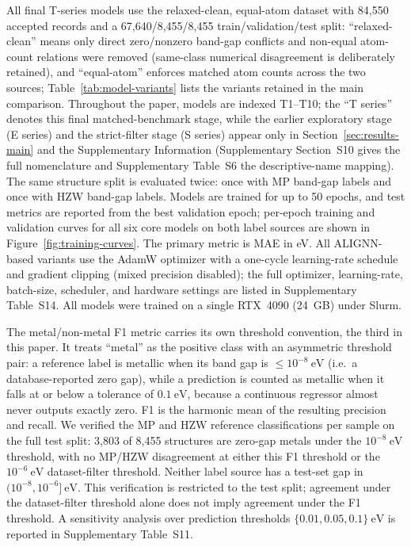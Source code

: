 \documentclass[a4paper,11pt]{article}
\newcommand{\ev}{\mathrm{eV}}
\begin{document}
All final T-series models use the relaxed-clean, equal-atom dataset with 84,550 accepted records and a 67,640/8,455/8,455 train/validation/test split: ``relaxed-clean'' means only direct zero/nonzero band-gap conflicts and non-equal atom-count relations were removed (same-class numerical disagreement is deliberately retained), and ``equal-atom'' enforces matched atom counts across the two sources; Table~\ref{tab:model-variants} lists the variants retained in the main comparison. Throughout the paper, models are indexed T1--T10; the ``T series'' denotes this final matched-benchmark stage, while the earlier exploratory stage (E series) and the strict-filter stage (S series) appear only in Section~\ref{sec:results-main} and the Supplementary Information (Supplementary Section~S10 gives the full nomenclature and Supplementary Table~S6 the descriptive-name mapping). The same structure split is evaluated twice: once with MP band-gap labels and once with HZW band-gap labels. Models are trained for up to 50 epochs, and test metrics are reported from the best validation epoch; per-epoch training and validation curves for all six core models on both label sources are shown in Figure~\ref{fig:training-curves}. The primary metric is MAE in eV. All ALIGNN-based variants use the AdamW optimizer \cite{kingma2015adam,loshchilov2019adamw} with a one-cycle learning-rate schedule \cite{smith2019superconvergence} and gradient clipping (mixed precision disabled); the full optimizer, learning-rate, batch-size, scheduler, and hardware settings are listed in Supplementary Table~S14. All models were trained on a single RTX~4090 (24~GB) under Slurm.

The metal/non-metal F1 metric carries its own threshold convention, the third in this paper. It treats ``metal'' as the positive class with an asymmetric threshold pair: a reference label is metallic when its band gap is \(\le 10^{-8}\ \ev\) (i.e.\ a database-reported zero gap), while a prediction is counted as metallic when it falls at or below a tolerance of \(0.1\ \ev\), because a continuous regressor almost never outputs exactly zero. F1 is the harmonic mean of the resulting precision and recall. We verified the MP and HZW reference classifications per sample on the full test split: 3,803 of 8,455 structures are zero-gap metals under the \(10^{-8}\ \ev\) threshold, with no MP/HZW disagreement at either this F1 threshold or the \(10^{-6}\ \ev\) dataset-filter threshold. Neither label source has a test-set gap in \((10^{-8},10^{-6}]\ \ev\). This verification is restricted to the test split; agreement under the dataset-filter threshold alone does not imply agreement under the F1 threshold. A sensitivity analysis over prediction thresholds \(\{0.01,0.05,0.1\}\ \ev\) is reported in Supplementary Table~S11.
\end{document}
